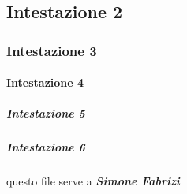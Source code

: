 \subsection*{Intestazione 2}

\subsubsection*{Intestazione 3}

\paragraph*{Intestazione 4}

\subparagraph*{Intestazione 5}

\subparagraph*{Intestazione 6}

questo file serve a {\itshape {\bfseries{Simone Fabrizi}}} 
